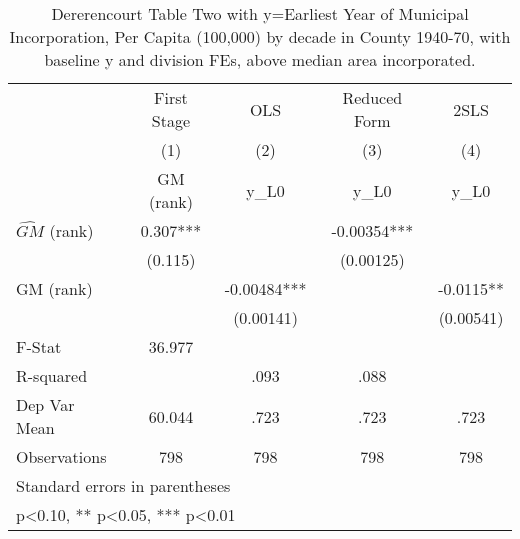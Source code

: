 \begin{table}[htbp]\centering
\def\sym#1{\ifmmode^{#1}\else\(^{#1}\)\fi}
\caption{Dererencourt Table Two with y=Earliest Year of Municipal Incorporation, Per Capita (100,000) by decade in County 1940-70, with baseline y and division FEs, above median area incorporated.}
\begin{tabular}{l*{4}{c}}
\toprule
                    & First Stage   &         OLS   &Reduced Form   &        2SLS   \\
                    &\multicolumn{1}{c}{(1)}&\multicolumn{1}{c}{(2)}&\multicolumn{1}{c}{(3)}&\multicolumn{1}{c}{(4)}\\
                    &\multicolumn{1}{c}{GM  (rank)}&\multicolumn{1}{c}{y\_L0}&\multicolumn{1}{c}{y\_L0}&\multicolumn{1}{c}{y\_L0}\\
\midrule
$\hat{GM}$ (rank)   &       0.307***&               &    -0.00354***&               \\
                    &     (0.115)   &               &   (0.00125)   &               \\
\addlinespace
GM  (rank)          &               &    -0.00484***&               &     -0.0115** \\
                    &               &   (0.00141)   &               &   (0.00541)   \\
\midrule
F-Stat              &      36.977   &               &               &               \\
R-squared           &               &        .093   &        .088   &               \\
Dep Var Mean        &      60.044   &        .723   &        .723   &        .723   \\
Observations        &         798   &         798   &         798   &         798   \\
\bottomrule
\multicolumn{5}{l}{\footnotesize Standard errors in parentheses}\\
\multicolumn{5}{l}{\footnotesize * p<0.10, ** p<0.05, *** p<0.01}\\
\end{tabular}
\end{table}
